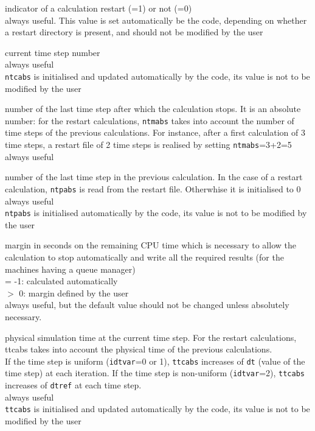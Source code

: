 {indicator of a calculation restart (=1) or not (=0)\\
always useful. This value is set automatically be the code, depending on
whether a restart directory is present, and should not be modified by
the user}

{current time step number\\
always useful\\
{\tt ntcabs} is initialised and updated automatically by the code,
its value is not to be modified by the user}

{number of the last time step after which the calculation stops. It is
an absolute number: for the restart calculations, {\tt ntmabs} takes into
account the number of time steps of the previous calculations. For
instance, after a first calculation of 3 time steps, a restart file of 2
time steps is realised by setting {\tt ntmabs}=3+2=5\\
always useful}

{number of the last time step in the previous calculation. In the case of
a restart calculation, {\tt ntpabs} is read from the restart file. Otherwhise
it is initialised to 0\\
always useful\\
{\tt ntpabs} is initialised automatically by the code, its value is not to
be modified by the user}

{margin in seconds on the remaining CPU time which is necessary to allow
the calculation to stop automatically and write all the required results
(for the machines having a queue manager)\\
\hspace*{1.3cm}= -1: calculated automatically\\
\hspace*{1.3cm}$>$ 0: margin defined by the user\\
always useful, but the default value should not be changed
unless absolutely necessary.}


{physical simulation time at the current time step. For the restart
calculations, \mbox{ttcabs} takes into account the physical time of the
previous calculations.\\
If the time step is uniform ({\tt idtvar}=0 or 1), {\tt ttcabs} increases
of {\tt dt} (value of the time step) at each iteration. If the time step is
non-uniform ({\tt idtvar}=2),
{\tt ttcabs} increases of {\tt dtref} at each time step.\\
always useful\\
{\tt ttcabs} is initialised and updated automatically by the code,
its value is not to be modified by the user}

